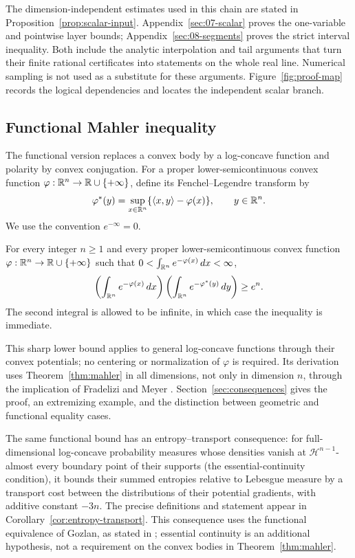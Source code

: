 The dimension-independent estimates used in this chain are stated in
Proposition~\ref{prop:scalar-input}. Appendix~\ref{sec:07-scalar} proves
the one-variable and pointwise layer bounds; Appendix~\ref{sec:08-segments}
proves the strict interval inequality. Both include the analytic
interpolation and tail arguments that turn their finite rational
certificates into statements on the whole real line. Numerical sampling
is not used as a substitute for these arguments. Figure~\ref{fig:proof-map}
records the logical dependencies and locates the independent scalar branch.



\subsection*{Functional Mahler inequality}

The functional version replaces a convex body by a log-concave function
and polarity by convex conjugation. For a proper lower-semicontinuous
convex function $\varphi:\mathbb R^n\to\mathbb R\cup\{+\infty\}$, define its
Fenchel--Legendre transform by
\[
 \varphi^*(y)=\sup_{x\in\mathbb R^n}\{\langle x,y\rangle-\varphi(x)\},
 \qquad y\in\mathbb R^n.
\]
We use the convention $e^{-\infty}=0$.

\begin{corollary}\label{cor:functional-mahler}
For every integer $n\ge1$ and every proper lower-semicontinuous convex
function $\varphi:\mathbb R^n\to\mathbb R\cup\{+\infty\}$ such that
$0<\int_{\mathbb R^n}e^{-\varphi(x)}\,dx<\infty$,
\[
 \left(\int_{\mathbb R^n}e^{-\varphi(x)}\,dx\right)
 \left(\int_{\mathbb R^n}e^{-\varphi^*(y)}\,dy\right)\ge e^n.
\]
The second integral is allowed to be infinite, in which case the
inequality is immediate.
\end{corollary}

This sharp lower bound applies to general log-concave functions through
their convex potentials; no centering or normalization of $\varphi$ is
required. Its derivation uses Theorem~\ref{thm:mahler} in all dimensions,
not only in dimension $n$, through the implication of Fradelizi and
Meyer \cite[Proposition~2(a)]{FradeliziMeyer2008}.
Section~\ref{sec:consequences} gives the proof, an extremizing example,
and the distinction between geometric and functional equality cases.

The same functional bound has an entropy--transport consequence: for
full-dimensional log-concave probability measures whose densities vanish
at $\mathcal H^{n-1}$-almost every boundary point of their supports
(the essential-continuity condition), it bounds their summed entropies relative to
Lebesgue measure by a transport cost between the distributions of their
potential gradients, with additive constant $-3n$. The precise
definitions and statement appear in Corollary~\ref{cor:entropy-transport}.
This consequence uses the functional equivalence of Gozlan, as stated
in \cite[Theorem~1.3]{FradeliziGozlanZugmeyer2021}; essential continuity
is an additional hypothesis, not a requirement on the convex bodies in
Theorem~\ref{thm:mahler}.
